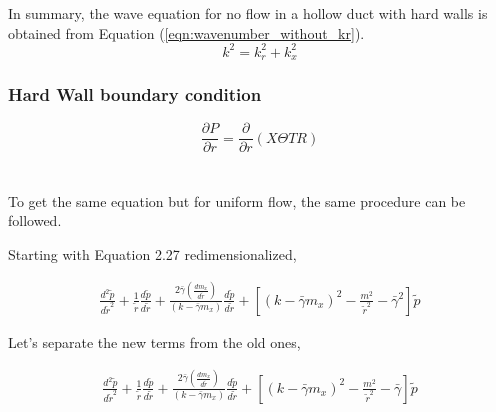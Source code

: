 \documentclass[a4paper]{report}
\begin{document}
In summary, the wave equation for no flow in a hollow duct with hard walls is obtained 
from Equation (\ref{eqn:wavenumber_without_kr}).
\begin{equation}
    k^2 = k_r^2 + k_x^2
    \label{eqn:wavenumber_equation}
\end{equation}

\subsubsection{Hard Wall boundary condition}
\begin{equation}
    \frac{\partial P}{\partial r} = \frac{\partial}{\partial r} \left( X\Theta T R \right)
\end{equation}

\section{}

To get the same equation but for uniform flow, the same procedure can be followed.

Starting with Equation 2.27 redimensionalized, 

\begin{align*}
    \frac{ d^2 \tilde{p}}{d \tilde{r}^2} +
    \frac{1}{\tilde{r}} 
    \frac{d \tilde{p}}{d \tilde{r}} + 
    \frac{2 \bar{\gamma} \left( \frac{d m_x}{d \tilde{r}} \right)}
    {\left( k - \bar{\gamma} m_x \right)}\frac{d \tilde{p}}{d \tilde{r}}+
    \left[ \left( k - \bar{\gamma} m_x \right)^2 - \frac{m^2}{\tilde{r}^2}- 
    \bar{\gamma}^2 \right] \tilde{p}
\end{align*}

Let's separate the new terms from the old ones, 

\begin{align*}
    \frac{ d^2 \tilde{p}}{d \tilde{r}^2} +
    \frac{1}{\tilde{r}} 
    \frac{d \tilde{p}}{d \tilde{r}} + 
    \frac{2 \bar{\gamma} \left( \frac{d m_x}{d \tilde{r}} \right)}
    {\left( k - \bar{\gamma} m_x \right)}\frac{d \tilde{p}}{d \tilde{r}}+
    \left[ \left( k - \bar{\gamma} m_x \right)^2 - \frac{m^2}{\tilde{r}^2}- 
    \bar{\gamma} \right] \tilde{p}
\end{align*}
\end{document}
